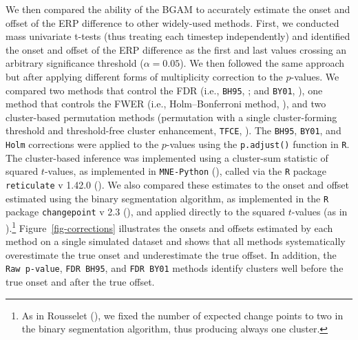 \documentclass[
  doc,
  floatsintext,
  longtable,
  a4paper,
  nolmodern,
  notxfonts,
  notimes,
  colorlinks=true,linkcolor=blue,citecolor=blue,urlcolor=blue]{apa7}
\begin{document}
We then compared the ability of the BGAM to accurately estimate the
onset and offset of the ERP difference to other widely-used methods.
First, we conducted mass univariate t-tests (thus treating each timestep
independently) and identified the onset and offset of the ERP difference
as the first and last values crossing an arbitrary significance
threshold (\(\alpha = 0.05\)). We then followed the same approach but
after applying different forms of multiplicity correction to the
\(p\)-values. We compared two methods that control the FDR (i.e.,
\texttt{BH95}, ; and \texttt{BY01}, ), one method that controls the FWER (i.e.,
Holm--Bonferroni method, ), and two
cluster-based permutation methods (permutation with a single
cluster-forming threshold and threshold-free cluster enhancement,
\texttt{TFCE}, ). The
\texttt{BH95}, \texttt{BY01}, and \texttt{Holm} corrections were applied
to the \(p\)-values using the \texttt{p.adjust()} function in
\texttt{R}. The cluster-based inference was implemented using a
cluster-sum statistic of squared \(t\)-values, as implemented in
\texttt{MNE-Python} (),
called via the \texttt{R} package \texttt{reticulate} v 1.42.0
(). We also compared these
estimates to the onset and offset estimated using the binary
segmentation algorithm, as implemented in the \texttt{R} package
\texttt{changepoint} v 2.3 (), and applied directly to the squared \(t\)-values (as in
).\footnote{As in
  Rousselet (), we fixed the
  number of expected change points to two in the binary segmentation
  algorithm, thus producing always one cluster.}
Figure~\ref{fig-corrections} illustrates the onsets and offsets
estimated by each method on a single simulated dataset and shows that
all methods systematically overestimate the true onset and underestimate
the true offset. In addition, the \texttt{Raw\ p-value},
\texttt{FDR\ BH95}, and \texttt{FDR\ BY01} methods identify clusters
well before the true onset and after the true offset.
\end{document}
